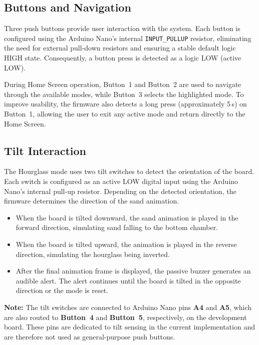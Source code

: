 \documentclass[12pt,a4paper]{article}
\begin{document}
\subsection{Buttons and Navigation}

Three push buttons provide user interaction with the system. Each button is configured using the Arduino Nano's internal \texttt{INPUT\_PULLUP} resistor, eliminating the need for external pull-down resistors and ensuring a stable default logic HIGH state. Consequently, a button press is detected as a logic LOW (active LOW).

During Home Screen operation, Button~1 and Button~2 are used to navigate through the available modes, while Button~3 selects the highlighted mode. To improve usability, the firmware also detects a long press (approximately 5\,s) on Button~1, allowing the user to exit any active mode and return directly to the Home Screen.

\subsection{Tilt Interaction}

The Hourglass mode uses two tilt switches to detect the orientation of the board. Each switch is configured as an active LOW digital input using the Arduino Nano's internal pull-up resistor. Depending on the detected orientation, the firmware determines the direction of the sand animation.

\begin{itemize}[itemsep=2pt]
    \item When the board is tilted downward, the sand animation is played in the forward direction, simulating sand falling to the bottom chamber.
    
    \item When the board is tilted upward, the animation is played in the reverse direction, simulating the hourglass being inverted.
    
    \item After the final animation frame is displayed, the passive buzzer generates an audible alert. The alert continues until the board is tilted in the opposite direction or the mode is reset.
\end{itemize}
\textbf{Note:} The tilt switches are connected to Arduino Nano pins \textbf{A4} and \textbf{A5}, which are also routed to \textbf{Button~4} and \textbf{Button~5}, respectively, on the development board. These pins are dedicated to tilt sensing in the current implementation and are therefore not used as general-purpose push buttons.
\end{document}
